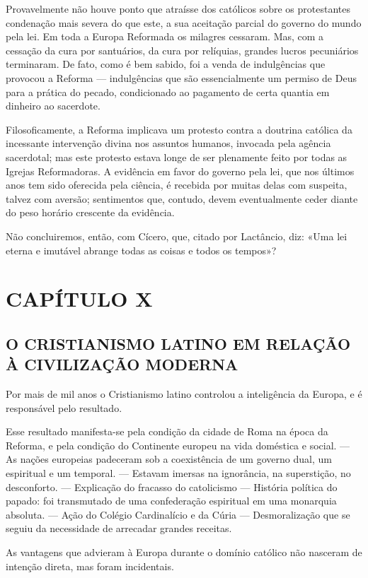 \documentclass[11pt,a5paper,twoside,openany]{book}
\begin{document}
Provavelmente não houve ponto que atraísse dos católicos sobre os protestantes condenação mais severa do que este, a sua aceitação parcial do governo do mundo pela lei. Em toda a Europa Reformada os milagres cessaram. Mas, com a cessação da cura por santuários, da cura por relíquias, grandes lucros pecuniários terminaram. De fato, como é bem sabido, foi a venda de indulgências que provocou a Reforma — indulgências que são essencialmente um permiso de Deus para a prática do pecado, condicionado ao pagamento de certa quantia em dinheiro ao sacerdote.

Filosoficamente, a Reforma implicava um protesto contra a doutrina católica da incessante intervenção divina nos assuntos humanos, invocada pela agência sacerdotal; mas este protesto estava longe de ser plenamente feito por todas as Igrejas Reformadoras. A evidência em favor do governo pela lei, que nos últimos anos tem sido oferecida pela ciência, é recebida por muitas delas com suspeita, talvez com aversão; sentimentos que, contudo, devem eventualmente ceder diante do peso horário crescente da evidência.

Não concluiremos, então, com Cícero, que, citado por Lactâncio, diz: «Uma lei eterna e imutável abrange todas as coisas e todos os tempos»?

\clearpage
\chapter*{CAPÍTULO X}
\section*{O CRISTIANISMO LATINO EM RELAÇÃO À CIVILIZAÇÃO MODERNA}
Por mais de mil anos o Cristianismo latino controlou a inteligência da Europa, e é responsável pelo resultado.

Esse resultado manifesta-se pela condição da cidade de Roma na época da Reforma, e pela condição do Continente europeu na vida doméstica e social. — As nações europeias padeceram sob a coexistência de um governo dual, um espiritual e um temporal. — Estavam imersas na ignorância, na superstição, no desconforto. — Explicação do fracasso do catolicismo — História política do papado: foi transmutado de uma confederação espiritual em uma monarquia absoluta. — Ação do Colégio Cardinalício e da Cúria — Desmoralização que se seguiu da necessidade de arrecadar grandes receitas.

As vantagens que advieram à Europa durante o domínio católico não nasceram de intenção direta, mas foram incidentais.
\end{document}
